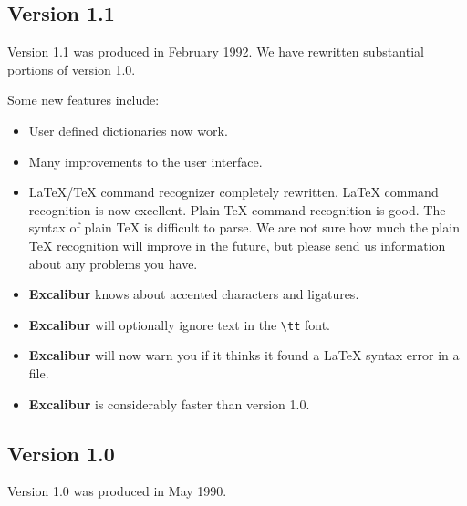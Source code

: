﻿\documentclass[11pt,titlepage]{article}
\newcommand{\ex}{\textbf{Excalibur}}
\begin{document}
\subsection{Version 1.1}

Version 1.1 was produced in February 1992. We have rewritten
substantial portions of version 1.0.

Some new features include:

\begin{itemize}
\item User defined dictionaries now work.

\item Many improvements to the user interface.

\item \LaTeX/\TeX{} command recognizer completely rewritten.  \LaTeX{}
  command recognition is now excellent. Plain \TeX{} command
  recognition is good. The syntax of plain \TeX{} is difficult to
  parse. We are not sure how much the plain \TeX{} recognition will
  improve in the future, but please send us information about any
  problems you have.

\item \ex{} knows about accented characters and ligatures.

\item \ex{} will optionally ignore text in the \verb+\tt+ font.

\item \ex{} will now warn you if it thinks it found a \LaTeX{} syntax
  error in a file.

\item \ex{} is considerably faster than version 1.0.
\end{itemize}

\subsection{Version 1.0}

Version 1.0 was produced in May 1990.
\end{document}
